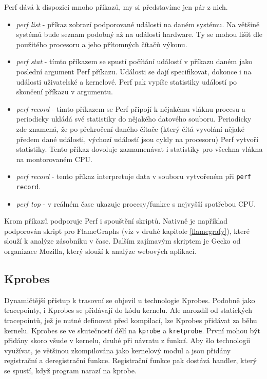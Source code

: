 Perf dává k dispozici mnoho příkazů, my si představíme jen pár z nich.
\begin{itemize}
    \item \emph{perf list} - příkaz zobrazí podporované události na daném systému. Na většině systémů bude seznam podobný až na události hardware. Ty se mohou lišit dle použitého procesoru a jeho přítomných čítačů výkonu.
    \item \emph{perf stat} - tímto příkazem se spustí počítání událostí v příkazu daném jako poslední argument Perf příkazu. Události se dají specifikovat, dokonce i na události uživatelské a kernelové. Perf pak vypíše statistiky událostí po skončení příkazu v argumentu.
    \item \emph{perf record} - tímto příkazem se Perf připojí k nějakému vláknu procesu a periodicky ukládá své statistiky do nějakého datového souboru. Periodicky zde znamená, že po překročení daného čítače (který čítá vyvolání nějaké předem dané události, výchozí událostí jsou cykly na procesoru) Perf vytvoří statistiky. Tento příkaz dovoluje zaznamenávat i statistiky pro všechna vlákna na montorovaném CPU.
    \item \emph{perf record} - tento příkaz interpretuje data v souboru vytvořeném při \texttt{perf record}.
    \item \emph{perf top} - v reálném čase ukazuje procesy/funkce s nejvyšší spotřebou CPU.
\end{itemize}
Krom příkazů podporuje Perf i spouštění skriptů. Nativně je například podporován skript pro FlameGraphs (viz v druhé kapitole \ref{flamegrafy}), které slouží k analýze zásobníku v čase. Dalším zajímavým skriptem je Gecko od organizace Mozilla, který slouží k analýze webových aplikací.

\subsection{Kprobes}
\label{kprobování}

Dynamičtější přístup k trasovní se objevil u technologie Kprobes. Podobně jako tracepointy, i Kprobes se přidávají do kódu kernelu. Ale narozdíl od statických tracepointů, jež je nutné definovat před kompilací, lze Kprobes přidávat za běhu kernelu. Kprobes se ve skutečností dělí na \texttt{kprobe} a \texttt{kretprobe}. První mohou být přidány skoro všude v kernelu, druhé při návratu z funkcí. Aby šlo technologii využívat, je většinou zkompilována jako kernelový modul a jsou přidány registrační a deregistrační funkce. Registrační funkce pak dostává handler, který se spustí, když program narazí na kprobe.

